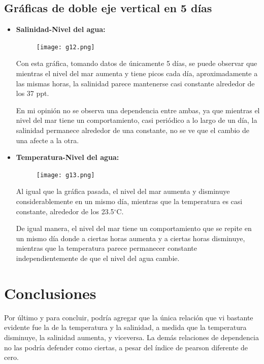 \documentclass[12pt]{article}
\begin{document}
\subsection{Gráficas de doble eje vertical en 5 días}

\begin{itemize}
\item \textbf{Salinidad-Nivel del agua:}

\begin{figure}[h!]
  \texttt{[image: g12.png]}
  \centering
  \label{fig:g12}
\end{figure}

Con esta gráfica, tomando datos de únicamente 5 días, se puede observar que mientras el nivel del mar aumenta y tiene picos cada día, aproximadamente a las mismas horas, la salinidad parece mantenerse casi constante alrededor de los 37 ppt.

En mi opinión no se observa una dependencia entre ambas, ya que mientras el nivel del mar tiene un comportamiento, casi periódico a lo largo de un día, la salinidad permanece alrededor de una constante, no se ve que el cambio de una afecte a la otra. 

\item\textbf{Temperatura-Nivel del agua:}

\begin{figure}[h!]
  \texttt{[image: g13.png]}
  \centering
  \label{fig:g13}
\end{figure}

Al igual que la gráfica pasada, el nivel del mar aumenta y disminuye considerablemente en un mismo día, mientras que la temperatura es casi constante, alrededor de los 23.5$^{\circ}$C.

De igual manera, el nivel del mar tiene un comportamiento que se repite en un mismo día donde a ciertas horas aumenta y a ciertas horas disminuye, mientras que la temperatura parece permanecer constante independientemente de que el nivel del agua cambie. 

\end{itemize}

\clearpage
\section{Conclusiones}

Por último y para concluir, podría agregar que la única relación que vi bastante evidente fue la de la temperatura y la salinidad, a medida que la temperatura disminuye, la salinidad aumenta, y viceversa. La demás relaciones de dependencia no las podría defender como ciertas, a pesar del índice de pearson diferente de cero. \\
\end{document}
